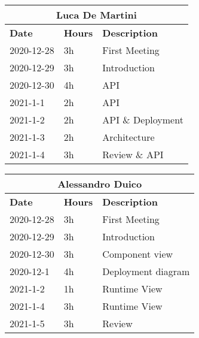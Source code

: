 
\begin{table}[H]
    \centering
    \begin{tabular}{|l|l|l|}
        \multicolumn{3}{c}{\textbf{Luca De Martini}}                   \\
        \hline
        \textbf{Date} & \textbf{Hours} & \textbf{Description}          \\\hline
        2020-12-28    & 3h             & First Meeting       \\\hline
        2020-12-29    & 3h             & Introduction       \\\hline
        2020-12-30    & 4h             & API       \\\hline
        2021-1-1    & 2h             & API       \\\hline
        2021-1-2    & 2h             & API \& Deployment       \\\hline
        2021-1-3    & 2h             & Architecture       \\\hline
        2021-1-4    & 3h             & Review \& API       \\\hline
    \end{tabular}
\end{table}
\begin{table}[H]
    \centering
    \begin{tabular}{|l|l|l|}
        \multicolumn{3}{c}{\textbf{Alessandro Duico}}                      \\
        \hline
        \textbf{Date} & \textbf{Hours} & \textbf{Description}              \\\hline
        2020-12-28    & 3h             & First Meeting           \\\hline
        2020-12-29    & 3h             & Introduction       \\\hline
        2020-12-30    & 3h             & Component view     \\\hline
        2020-12-1     & 4h             & Deployment diagram \\\hline
        2021-1-2     & 1h             & Runtime View   \\\hline
        2021-1-4     & 3h             & Runtime View   \\\hline
        2021-1-5     & 3h             & Review \\\hline
    \end{tabular}
\end{table}
